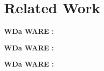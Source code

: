 

\section{Related Work}
\label{sec:RW}
\lipsum[3-5]

{\bf WDa WARE :} 
\lipsum[3-5]

{\bf WDa WARE :} 
\lipsum[3-5]

{\bf WDa WARE :} 
\lipsum[3-5]